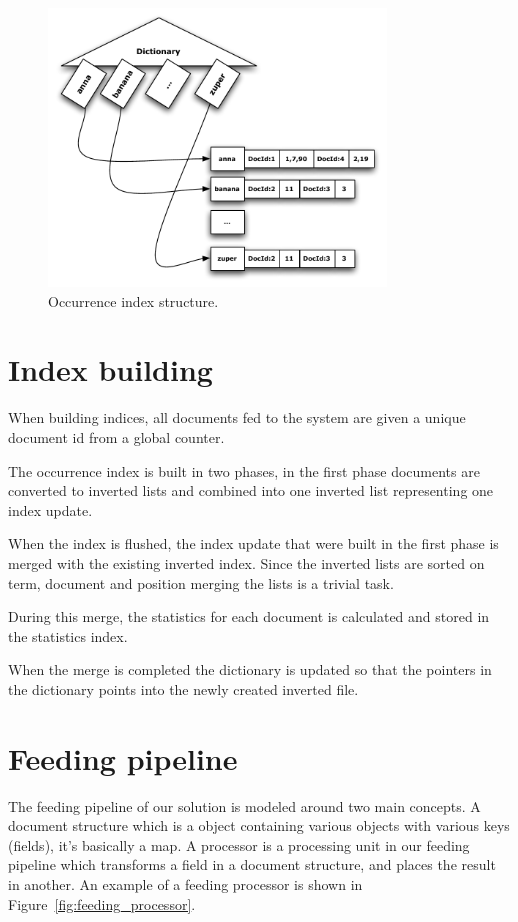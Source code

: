 \begin{figure}[h!!tb]
	\centering
	\includegraphics[width=0.8\textwidth]{include/index.pdf}
	\caption[Occurrence index structure]{Occurrence index structure.}\label{fig:occ_index_struct}
\end{figure}

\section{Index building}\label{sub:index_building}
When building indices, all documents fed to the system are given a unique document id from a global counter.

The occurrence index is built in two phases, in the first phase documents are converted to inverted lists and combined into one inverted list representing one index update. 

When the index is flushed, the index update that were built in the first phase is merged with the existing inverted index. Since the inverted lists are sorted on term, document and position merging the lists is a trivial task. 

During this merge, the statistics for each document is calculated and stored in the statistics index. 

When the merge is completed the dictionary is updated so that the pointers in the dictionary points into the newly created inverted file. 

\section{Feeding pipeline}\label{sec:feeding_pipeline}
The feeding pipeline of our solution is modeled around two main concepts. A document structure which is a object containing various objects with various keys (fields), it's basically a map. A processor is a processing unit in our feeding pipeline which transforms a field in a document structure, and places the result in another. An example of a feeding processor is shown in Figure~\ref{fig:feeding_processor}.


